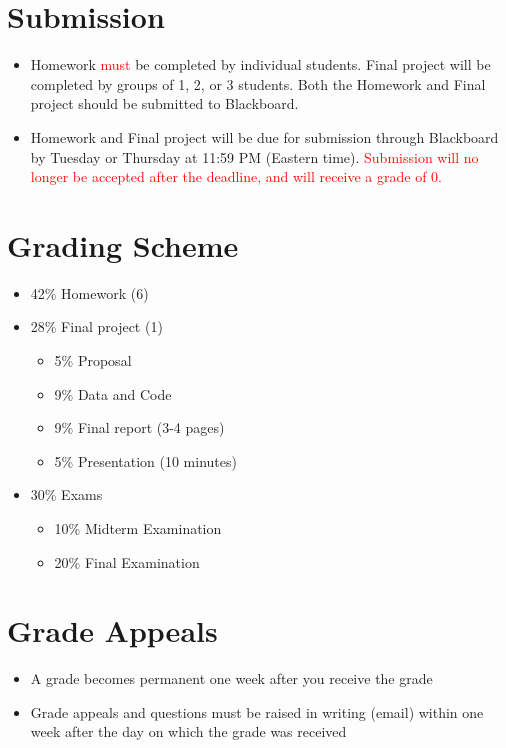 \documentclass[pdftex,11pt]{artikel3}
\begin{document}
\section{Submission}
\begin{itemize}
\item Homework \textcolor{red}{must} be completed by individual students. Final project will be completed by groups of 1, 2, or 3 students. Both the Homework and Final project should be submitted to Blackboard.
\item Homework and Final project will be due for submission through Blackboard by Tuesday or Thursday
at 11:59 PM (Eastern time). \textcolor{red}{Submission will no longer be accepted after the deadline, and will receive a grade of 0.}
\end{itemize}

\section{Grading Scheme}
\begin{itemize}
\item 42\% Homework (6)
\item 28\% Final project (1) 
	\begin{itemize}
	\item 5\% Proposal
	\item 9\% Data and Code
	\item 9\% Final report (3-4 pages)
	\item 5\% Presentation (10 minutes)
	\end{itemize}
\item 30\% Exams
	\begin{itemize}
	\item 10\% Midterm Examination
	\item 20\% Final Examination
	\end{itemize}
\end{itemize}

\section{Grade Appeals}
\begin{itemize}
\item A grade becomes permanent one week after you receive the grade
\item Grade appeals and questions must be raised in writing (email) within one week after the day on which the grade was received
\end{itemize}
\end{document}
